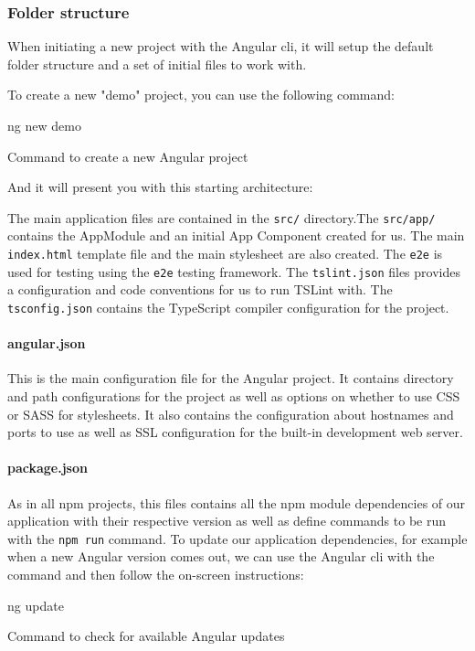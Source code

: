 \documentclass[twoside, openright,11pt,a4paper]{book}
\newenvironment{code}{\captionsetup{type=listing}}{}
\begin{document}
\subsubsection{Folder structure}
When initiating a new project with the Angular \gls{cli}, it will setup the default folder structure and a set of initial files to work with.

To create a new "demo" project, you can use the following command:
\begin{code}
	\begin{shell}
ng new demo
	\end{shell}
	\caption{Command to create a new Angular project}
\end{code}
And it will present you with this starting architecture:

The main application files are contained in the \verb+src/+ directory.The \verb+src/app/+ contains the AppModule and an initial App Component created for us. The main \verb+index.html+ template file and the main stylesheet are also created. The \verb+e2e+ is used for testing using the \verb+e2e+ testing framework. The \verb+tslint.json+ files provides a configuration and code conventions for us to run TSLint with. The \verb+tsconfig.json+ contains the TypeScript compiler configuration for the project.
\paragraph{angular.json}
This is the main configuration file for the Angular project. It contains directory and path configurations for the project as well as options on whether to use CSS or SASS for stylesheets. It also contains the configuration about hostnames and ports to use as well as SSL configuration for the built-in development web server.

\paragraph{package.json}
As in all \gls{npm} projects, this files contains all the \gls{npm} module dependencies of our application with their respective version as well as define commands to be run with the \verb+npm run+ command. To update our application dependencies, for example when a new Angular version comes out, we can use the Angular \gls{cli} with the command and then follow the on-screen instructions:
\begin{code}
	\begin{shell}
ng update
	\end{shell}
	\caption{Command to check for available Angular updates}
\end{code}
\end{document}
